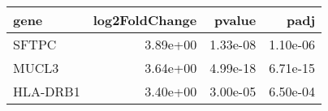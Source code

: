 \begin{tabular}{lrrr}
\toprule
    gene &  log2FoldChange &   pvalue &     padj \\
\midrule
   SFTPC &        3.89e+00 & 1.33e-08 & 1.10e-06 \\
   MUCL3 &        3.64e+00 & 4.99e-18 & 6.71e-15 \\
HLA-DRB1 &        3.40e+00 & 3.00e-05 & 6.50e-04 \\
\bottomrule
\end{tabular}
